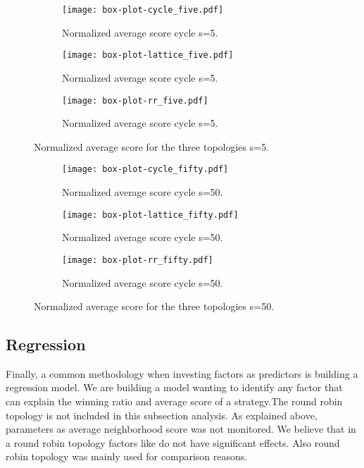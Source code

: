 \begin{figure}[H]
\centering
    \begin{subfigure}[t]{1\textwidth}
    \centering
        \texttt{[image: box-plot-cycle\_five.pdf]}
    \caption{Normalized average score cycle s=5.}
    \end{subfigure}
\hfill
    \begin{subfigure}[t]{1\textwidth}\centering
    \centering
        \texttt{[image: box-plot-lattice\_five.pdf]}
    \caption{Normalized average score cycle s=5.}
    \end{subfigure}
\hfill
    \begin{subfigure}[t]{1\textwidth}\centering
    \centering
        \texttt{[image: box-plot-rr\_five.pdf]}
    \caption{Normalized average score cycle s=5.}
    \end{subfigure}
\caption{Normalized average score for the three topologies s=5.}
\label{fig:average-score-five}
\end{figure}

\begin{figure}[H]
\centering
    \begin{subfigure}[t]{1\textwidth}
    \centering
        \texttt{[image: box-plot-cycle\_fifty.pdf]}
    \caption{Normalized average score cycle s=50.}
    \end{subfigure}
\hfill
    \begin{subfigure}[t]{1\textwidth}\centering
    \centering
        \texttt{[image: box-plot-lattice\_fifty.pdf]}
    \caption{Normalized average score cycle s=50.}
    \end{subfigure}
\hfill
    \begin{subfigure}[t]{1\textwidth}\centering
    \centering
        \texttt{[image: box-plot-rr\_fifty.pdf]}
    \caption{Normalized average score cycle s=50.}
    \end{subfigure}
\caption{Normalized average score for the three topologies s=50.}
\label{fig:average-score-fifty}
\end{figure}


\subsection{Regression}

Finally, a common methodology when investing factors as predictors is building a
regression model. We are building a model wanting to identify any factor that can
explain the winning ratio and  average score of a strategy.The round robin
topology is not included in this subsection analysis. As explained
above, parameters as average neighborhood score was not monitored. We believe
that in a round robin topology factors like do not have significant effects.
Also round robin topology was mainly used for comparison reasons.


